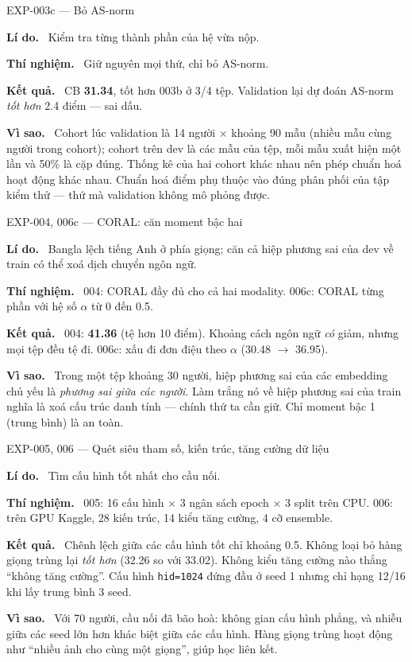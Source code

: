 \documentclass[11pt,a4paper,oneside]{report}
\newcommand{\up}[1]{\textbf{\color{good}#1}}
\newcommand{\down}[1]{\textbf{\color{bad}#1}}
\newcommand{\id}[1]{\texttt{#1}}
\newcommand{\field}[1]{\par\smallskip\textbf{\color{accent}#1.}~}
\begin{document}
\begin{expbox}{EXP-003c --- Bỏ AS-norm}
\field{Lí do} Kiểm tra từng thành phần của hệ vừa nộp.
\field{Thí nghiệm} Giữ nguyên mọi thứ, chỉ bỏ AS-norm.
\field{Kết quả} CB \up{31.34}, tốt hơn 003b ở 3/4 tệp. Validation lại dự đoán AS-norm \emph{tốt hơn} 2.4 điểm --- sai dấu.
\field{Vì sao} Cohort lúc validation là 14 người $\times$ khoảng 90 mẫu (nhiều mẫu cùng người trong cohort); cohort trên dev là các mẫu của tệp, mỗi mẫu xuất hiện một lần và 50\% là cặp đúng. Thống kê của hai cohort khác nhau nên phép chuẩn hoá hoạt động khác nhau. Chuẩn hoá điểm phụ thuộc vào đúng phân phối của tập kiểm thử --- thứ mà validation không mô phỏng được.
\end{expbox}

\begin{expbox}{EXP-004, 006c --- CORAL: căn moment bậc hai}
\field{Lí do} Bangla lệch tiếng Anh ở phía giọng; căn cả hiệp phương sai của dev về train có thể xoá dịch chuyển ngôn ngữ.
\field{Thí nghiệm} 004: CORAL đầy đủ cho cả hai modality. 006c: CORAL từng phần với hệ số $\alpha$ từ 0 đến 0.5.
\field{Kết quả} 004: \down{41.36} (tệ hơn 10 điểm). Khoảng cách ngôn ngữ \emph{có} giảm, nhưng mọi tệp đều tệ đi. 006c: xấu đi đơn điệu theo $\alpha$ (30.48 $\to$ 36.95).
\field{Vì sao} Trong một tệp khoảng 30 người, hiệp phương sai của các embedding chủ yếu là \emph{phương sai giữa các người}. Làm trắng nó về hiệp phương sai của train nghĩa là xoá cấu trúc danh tính --- chính thứ ta cần giữ. Chỉ moment bậc 1 (trung bình) là an toàn.
\end{expbox}

\begin{expbox}{EXP-005, 006 --- Quét siêu tham số, kiến trúc, tăng cường dữ liệu}
\field{Lí do} Tìm cấu hình tốt nhất cho cầu nối.
\field{Thí nghiệm} 005: 16 cấu hình $\times$ 3 ngân sách epoch $\times$ 3 split trên CPU. 006: trên GPU Kaggle, 28 kiến trúc, 14 kiểu tăng cường, 4 cỡ ensemble.
\field{Kết quả} Chênh lệch giữa các cấu hình tốt chỉ khoảng 0.5. Không loại bỏ hàng giọng trùng lại \emph{tốt hơn} (32.26 so với 33.02). Không kiểu tăng cường nào thắng ``không tăng cường''. Cấu hình \id{hid=1024} đứng đầu ở seed 1 nhưng chỉ hạng 12/16 khi lấy trung bình 3 seed.
\field{Vì sao} Với 70 người, cầu nối đã bão hoà: không gian cấu hình phẳng, và nhiễu giữa các seed lớn hơn khác biệt giữa các cấu hình. Hàng giọng trùng hoạt động như ``nhiều ảnh cho cùng một giọng'', giúp học liên kết.
\end{expbox}
\end{document}
